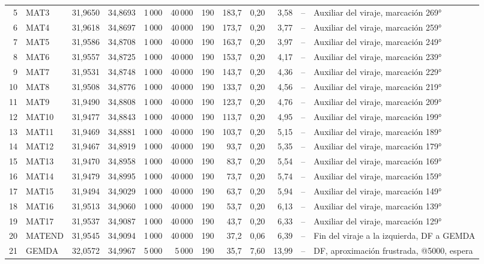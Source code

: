 \begin{longtable}{rlrrrrrrrrr>{\raggedright\arraybackslash}p{3.4cm}}
5 & MAT3 & 31,9650 & 34,8693 & 1\,000 & 40\,000 & 190 & 183,7 & 0,20 & 3,58 & -- & \scriptsize Auxiliar del viraje, marcación 269°\\
6 & MAT4 & 31,9618 & 34,8697 & 1\,000 & 40\,000 & 190 & 173,7 & 0,20 & 3,77 & -- & \scriptsize Auxiliar del viraje, marcación 259°\\
7 & MAT5 & 31,9586 & 34,8708 & 1\,000 & 40\,000 & 190 & 163,7 & 0,20 & 3,97 & -- & \scriptsize Auxiliar del viraje, marcación 249°\\
8 & MAT6 & 31,9557 & 34,8725 & 1\,000 & 40\,000 & 190 & 153,7 & 0,20 & 4,17 & -- & \scriptsize Auxiliar del viraje, marcación 239°\\
9 & MAT7 & 31,9531 & 34,8748 & 1\,000 & 40\,000 & 190 & 143,7 & 0,20 & 4,36 & -- & \scriptsize Auxiliar del viraje, marcación 229°\\
10 & MAT8 & 31,9508 & 34,8776 & 1\,000 & 40\,000 & 190 & 133,7 & 0,20 & 4,56 & -- & \scriptsize Auxiliar del viraje, marcación 219°\\
11 & MAT9 & 31,9490 & 34,8808 & 1\,000 & 40\,000 & 190 & 123,7 & 0,20 & 4,76 & -- & \scriptsize Auxiliar del viraje, marcación 209°\\
12 & MAT10 & 31,9477 & 34,8843 & 1\,000 & 40\,000 & 190 & 113,7 & 0,20 & 4,95 & -- & \scriptsize Auxiliar del viraje, marcación 199°\\
13 & MAT11 & 31,9469 & 34,8881 & 1\,000 & 40\,000 & 190 & 103,7 & 0,20 & 5,15 & -- & \scriptsize Auxiliar del viraje, marcación 189°\\
14 & MAT12 & 31,9467 & 34,8919 & 1\,000 & 40\,000 & 190 & 93,7 & 0,20 & 5,35 & -- & \scriptsize Auxiliar del viraje, marcación 179°\\
15 & MAT13 & 31,9470 & 34,8958 & 1\,000 & 40\,000 & 190 & 83,7 & 0,20 & 5,54 & -- & \scriptsize Auxiliar del viraje, marcación 169°\\
16 & MAT14 & 31,9479 & 34,8995 & 1\,000 & 40\,000 & 190 & 73,7 & 0,20 & 5,74 & -- & \scriptsize Auxiliar del viraje, marcación 159°\\
17 & MAT15 & 31,9494 & 34,9029 & 1\,000 & 40\,000 & 190 & 63,7 & 0,20 & 5,94 & -- & \scriptsize Auxiliar del viraje, marcación 149°\\
18 & MAT16 & 31,9513 & 34,9060 & 1\,000 & 40\,000 & 190 & 53,7 & 0,20 & 6,13 & -- & \scriptsize Auxiliar del viraje, marcación 139°\\
19 & MAT17 & 31,9537 & 34,9087 & 1\,000 & 40\,000 & 190 & 43,7 & 0,20 & 6,33 & -- & \scriptsize Auxiliar del viraje, marcación 129°\\
20 & MATEND & 31,9545 & 34,9094 & 1\,000 & 40\,000 & 190 & 37,2 & 0,06 & 6,39 & -- & \scriptsize Fin del viraje a la izquierda, DF a GEMDA\\
21 & GEMDA & 32,0572 & 34,9967 & 5\,000 & 5\,000 & 190 & 35,7 & 7,60 & 13,99 & -- & \scriptsize DF, aproximación frustrada, @5000, espera\\
\end{longtable}
\endgroup
